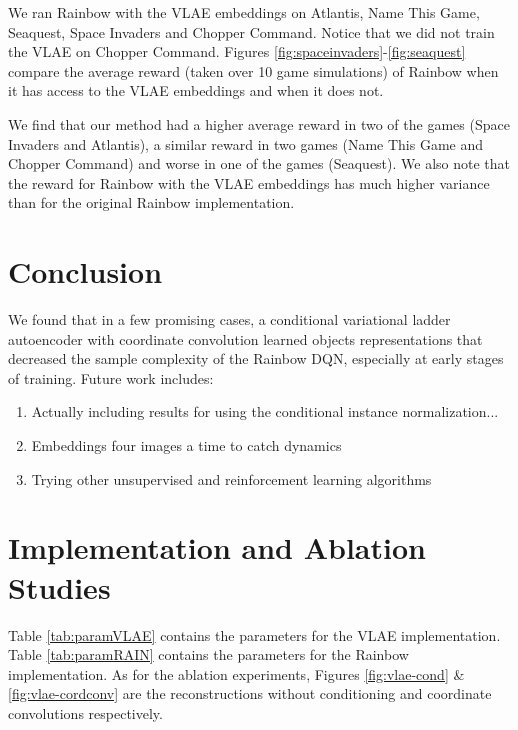 \documentclass{article}
\begin{document}
We ran Rainbow with the VLAE embeddings on Atlantis, Name This Game, Seaquest, Space Invaders and Chopper Command. 
Notice that we did not train the VLAE on Chopper Command.
Figures \ref{fig:spaceinvaders}-\ref{fig:seaquest} compare the average reward (taken over 10 game simulations) of Rainbow when it has access to the VLAE embeddings and when it does not.

We find that our method had a higher average reward in two of the games (Space Invaders and Atlantis), a similar reward in two games (Name This Game and Chopper Command) and worse in one of the games (Seaquest).
We also note that the reward for Rainbow with the VLAE embeddings has much higher variance than for the original Rainbow implementation.

\section{Conclusion}

We found that in a few promising cases, a conditional variational ladder autoencoder with coordinate convolution learned objects representations that decreased the sample complexity of the Rainbow DQN, especially at early stages of training.
Future work includes:
\begin{enumerate}
    \item Actually including results for using the conditional instance normalization...
    \item Embeddings four images a time to catch dynamics
    \item Trying other unsupervised and reinforcement learning algorithms
\end{enumerate}




\pagebreak
\appendix

\section{Implementation and Ablation Studies}

Table \ref{tab:paramVLAE} contains the parameters for the VLAE implementation.
Table \ref{tab:paramRAIN} contains the parameters for the Rainbow implementation. 
As for the ablation experiments, Figures \ref{fig:vlae-cond} \& \ref{fig:vlae-cordconv} are the reconstructions without conditioning and coordinate convolutions respectively.
\end{document}

